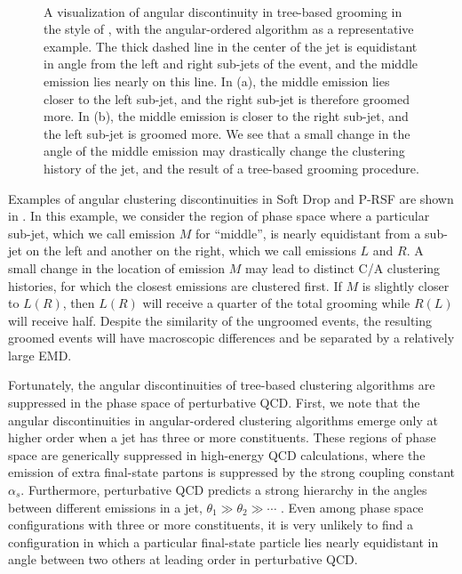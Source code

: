 \begin{figure}[t!]
      \centering
      ~~~~
\caption{
    A visualization of angular discontinuity in tree-based grooming in the style of , with the angular-ordered  algorithm as a representative example.
    The thick dashed line in the center of the jet is equidistant in angle from the left and right sub-jets of the event, and the middle emission lies nearly on this line.
    In (a), the middle emission lies closer to the left sub-jet, and the right sub-jet is therefore groomed more.
    In (b), the middle emission is closer to the right sub-jet, and the left sub-jet is groomed more.
    We see that a small change in the angle of the middle emission may drastically change the clustering history of the jet, and the result of a tree-based grooming procedure.
}
\label{fig:angdiscont}
\end{figure}


Examples of angular clustering discontinuities in Soft Drop and P-RSF are shown in .
%
In this example, we consider the region of phase space where a particular sub-jet, which we call emission \(M\) for ``middle'', is nearly equidistant from a sub-jet on the left and another on the right, which we call emissions \(L\) and \(R\).
%
A small change in the location of emission \(M\) may lead to distinct C/A clustering histories, for which the closest emissions are clustered first.
%
If \(M\) is slightly closer to \(L (R)\), then \(L (R)\) will receive a quarter of the total grooming while \(R (L)\) will receive half.
%
Despite the similarity of the ungroomed events, the resulting groomed events will have macroscopic differences and be separated by a relatively large EMD.

Fortunately, the angular discontinuities of tree-based clustering algorithms are suppressed in the phase space of perturbative QCD.
%
First, we note that the angular discontinuities in angular-ordered clustering algorithms emerge only at higher order when a jet has three or more constituents.
%
These regions of phase space are generically suppressed in high-energy QCD calculations, where the emission of extra final-state partons is suppressed by the strong coupling constant \(\alpha_s\).
%
Furthermore, perturbative QCD predicts a strong hierarchy in the angles between different emissions in a jet, \(\theta_1 \gg \theta_2 \gg \cdots\) \cite{Collins:2011zzd}.
%
Even among phase space configurations with three or more constituents, it is very unlikely to find a configuration in which a particular final-state particle lies nearly equidistant in angle between two others at leading order in perturbative QCD.

